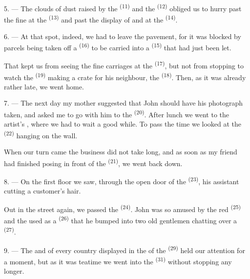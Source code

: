5. --- The clouds of dust raised by the 
\textsuperscript{(11)} and the  \textsuperscript{(12)} obliged us to
hurry past the fine  at the
 \textsuperscript{(13)} and past the display of
 and  at the  \textsuperscript{(14)}.

6. --- At that spot, indeed, we had to leave the pavement, for it was
blocked by parcels being taken off a  \textsuperscript{(16)} to be
carried into a  \textsuperscript{(15)} that had just been let.

That kept us from seeing the fine carriages at the
 \textsuperscript{(17)}, but not from stopping to watch the
 \textsuperscript{(19)} making a crate for his neighbour, the
 \textsuperscript{(18)}. Then, as it was already rather
late, we went home.

\VUsaut{3.0mm}

7. --- The next day my mother suggested that John should have his
photograph taken, and asked me to go with him to the
 \textsuperscript{(20)}. After lunch we went to the artist's
, where we had to wait a good while. To pass the time we
looked at the  \textsuperscript{(22)} hanging on the wall.

When our turn came the business did not take long, and as soon as my
friend had finished posing in front of the  \textsuperscript{(21)}, we
went back down.

8. --- On the first floor we saw, through the open door of the
 \textsuperscript{(23)}, his assistant cutting a customer's hair.

Out in the street again, we passed the  \textsuperscript{(24)}.
John was so amused by the red  \textsuperscript{(25)} and the
 used as a  \textsuperscript{(26)} that he bumped into two
old gentlemen chatting over a  \textsuperscript{(27)}.

\VUsaut{3.0mm}

9. --- The  and  of every country displayed in
the  of the  \textsuperscript{(29)} held our
attention for a moment, but as it was teatime we went into the
 \textsuperscript{(31)} without stopping any longer.

